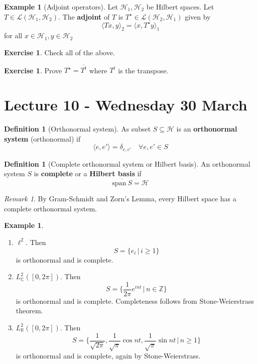 \documentclass[10pt, oneside, reqno]{amsart}
\theoremstyle{plain}%
\theoremstyle{definition}
\newtheorem{defn}[thm]{Definition}
\newtheorem{exmp}[thm]{Example}
\newtheorem{exer}[thm]{Exercise}
\theoremstyle{remark}
\newtheorem*{rem}{Remark}
\newcommand{\R}{\mathbb{R}}
\newcommand{\Hil}{\mathcal{H}}
\newcommand{\Com}{\mathbb{C}}
\newcommand{\Z}{\mathbb{Z}}
\newcommand{\spans}{\text{span}\ }
\begin{document}
\begin{exmp}[Adjoint operators]
    Let $\Hil_1, \Hil_2$ be Hilbert spaces.  Let $ T \in \mathcal{L}(\Hil_1, \Hil_2)$.  The \textbf{adjoint} of $T$ is $T^\star \in \mathcal{L}(\Hil_2, \Hil_1)$ given by \[
        \langle T x, y \rangle_2 = \langle x, T^\star y \rangle_1
    \] for all $x \in \Hil_1, y \in \Hil_2$
\end{exmp}

\begin{exer}
    Check all of the above.
\end{exer}

\begin{exer}
    Prove $T^\star = \overline{T^t}$ where $T^t$ is the transpose.   
\end{exer}

\section{Lecture 10 - Wednesday 30 March} %
\label{sec:lecture_10_wednesday_30_march}

\begin{defn}[Orthonormal system]
    As subset $S \subseteq \Hil$ is an \textbf{orthonormal system} (orthonormal) if \[
        \langle e, e' \rangle = \delta_{e, e'} \quad \forall e, e' \in S
    \]
\end{defn}

\begin{defn}[Complete orthonormal system or Hilbert basis]
    An orthonormal system $S$ is \textbf{complete} or a \textbf{Hilbert basis} if \[
        \overline{\spans S} = \Hil
    \]
\end{defn}

\begin{rem}
    By Gram-Schmidt and Zorn's Lemma, every Hilbert space has a complete orthonormal system.   
\end{rem}

\begin{exmp}
    \begin{enumerate}
        \item $\ell^2$.  Then \[
            S = \{ e_i \, | \, i \geq 1 \}
        \] is orthonormal and is complete.  
        \item $L^2_\Com([0, 2 \pi])$.  Then \[
            S = \{ \frac{1}{2\pi} e^{i n t} \, | \, n \in \Z \}
        \] is orthonormal and is complete.  Completeness follows from Stone-Weierstrass theorem.
        \item $L^2_\R([0, 2 \pi])$.  Then \[
            S= \{ \frac{1}{\sqrt{2\pi}}, \frac{1}{\sqrt{\pi}} \cos nt, \frac{1}{\sqrt{\pi}} \sin nt \, | \, n \geq 1 \}
        \] is orthonormal and is complete, again by Stone-Weierstrass.  
    \end{enumerate}
\end{exmp}
\end{document}
